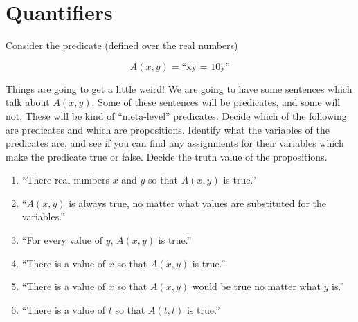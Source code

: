 \section{Quantifiers}


\begin{xca}

Consider the predicate (defined over the real numbers)

\[
A(x,y) = \textrm{``xy = 10y''}
\]

Things are going to get a little weird!  We are going to have some sentences which talk about $A(x,y)$.  Some of these sentences will be predicates, and some will not.  These will be kind of ``meta-level'' predicates.  Decide which of the following are predicates and which are propositions. Identify what the variables of the predicates are, and see if you can find any assignments for their variables which make the predicate true or false.  Decide the truth value of the propositions.

\begin{enumerate}
		\item ``There real numbers $x$ and $y$ so that $A(x,y)$ is true.''
		\item ``$A(x,y)$ is always true, no matter what values are substituted for the variables.''
	    \item  ``For every value of  $y$,  $A(x,y)$ is true.''
		\item ``There is a value of $x$ so that $A(x,y)$ is true.''
		\item ``There is a value of $x$ so that $A(x,y)$ would be true no matter what $y$ is.''
		\item ``There is a value of $t$ so that $A(t,t)$ is true.''
	\end{enumerate}
\end{xca}

